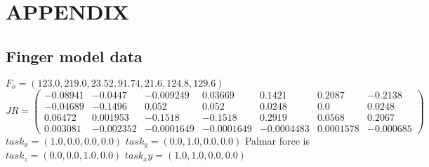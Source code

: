 \section{APPENDIX}

\subsection{Finger model data}
$F_o = (123.0, 219.0, 23.52, 91.74,	21.6, 124.8, 129.6)$\\
$
JR = 
\begin{pmatrix}
-0.08941 & -0.0447 & -0.009249 & 0.03669 & 0.1421 & 0.2087 & -0.2138 \\
-0.04689 & -0.1496 & 0.052 &0.052 & 0.0248 & 0.0 & 0.0248 \\ 
0.06472 & 0.001953 & -0.1518 &-0.1518 & 0.2919 & 0.0568 & 0.2067 \\
0.003081 & -0.002352 & -0.0001649 & -0.0001649 & -0.0004483 & 0.0001578 & -0.000685
\end{pmatrix}
$
$task_x = (1.0,0.0,0.0,0.0)$
$task_y = (0.0,1.0,0.0,0.0)$
Palmar force is $task_z = (0.0,0.0,1.0,0.0)$
$task_xy = (1.0,1.0,0.0,0.0)$